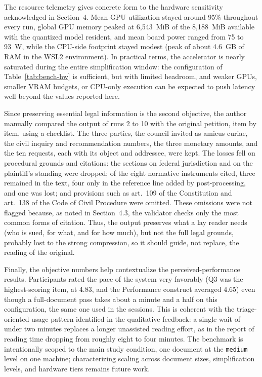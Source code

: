 \documentclass[english]{UNISINOSartigo} %
\begin{document}
The resource telemetry gives concrete form to the hardware sensitivity acknowledged in Section~4. Mean GPU utilization stayed around 95\% throughout every run, global GPU memory peaked at 6,543~MiB of the 8,188~MiB available with the quantized model resident, and mean board power ranged from 75 to 93~W, while the CPU-side footprint stayed modest (peak of about 4.6~GB of RAM in the WSL2 environment). In practical terms, the accelerator is nearly saturated during the entire simplification window: the configuration of Table~\ref{tab:bench-hw} is sufficient, but with limited headroom, and weaker GPUs, smaller VRAM budgets, or CPU-only execution can be expected to push latency well beyond the values reported here.

Since preserving essential legal information is the second objective, the author manually compared the output of runs 2 to 10 with the original petition, item by item, using a checklist. The three parties, the council invited as amicus curiae, the civil inquiry and recommendation numbers, the three monetary amounts, and the ten requests, each with its object and addressee, were kept. The losses fell on procedural grounds and citations: the sections on federal jurisdiction and on the plaintiff's standing were dropped; of the eight normative instruments cited, three remained in the text, four only in the reference line added by post-processing, and one was lost; and provisions such as art.~109 of the Constitution and art.~138 of the Code of Civil Procedure were omitted. These omissions were not flagged because, as noted in Section~4.3, the validator checks only the most common forms of citation. Thus, the output preserves what a lay reader needs (who is sued, for what, and for how much), but not the full legal grounds, probably lost to the strong compression, so it should guide, not replace, the reading of the original.

Finally, the objective numbers help contextualize the perceived-performance results. Participants rated the pace of the system very favorably (Q3 was the highest-scoring item, at 4.83, and the Performance construct averaged 4.65) even though a full-document pass takes about a minute and a half on this configuration, the same one used in the sessions. This is coherent with the triage-oriented usage pattern identified in the qualitative feedback: a single wait of under two minutes replaces a longer unassisted reading effort, as in the report of reading time dropping from roughly eight to four minutes. The benchmark is intentionally scoped to the main study condition, one document at the \texttt{medium} level on one machine; characterizing scaling across document sizes, simplification levels, and hardware tiers remains future work.
\end{document}
